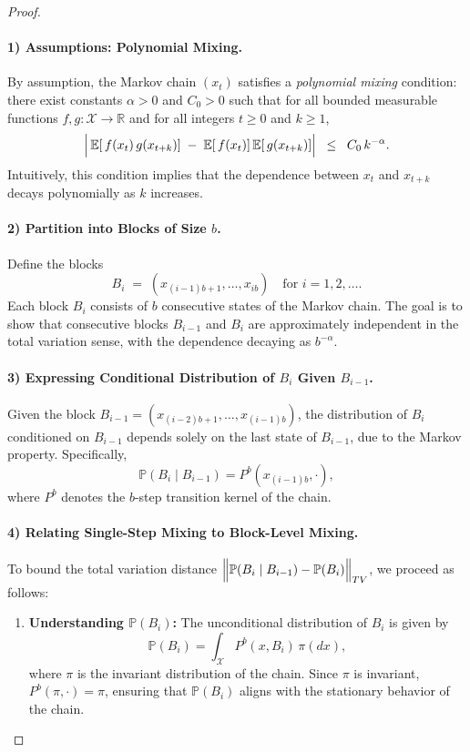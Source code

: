 \begin{proof}
\;\newline
\paragraph{1) Assumptions: Polynomial Mixing.}
By assumption, the Markov chain \( (x_t) \) satisfies a \emph{polynomial mixing} condition: there exist constants \( \alpha > 0 \) and \( C_0 > 0 \) such that for all bounded measurable functions \( f, g: \mathcal{X} \to \mathbb{R} \) and for all integers \( t \geq 0 \) and \( k \geq 1 \),
\[
  \Bigl|\,
    \mathbb{E}[\,f(x_t)\,g(x_{t+k})]
    \;-\;
    \mathbb{E}[\,f(x_t)]\,\mathbb{E}[\,g(x_{t+k})]
  \Bigr|
  \;\;\le\;\;
  C_0\,k^{-\alpha}.
\]
Intuitively, this condition implies that the dependence between \( x_t \) and \( x_{t+k} \) decays polynomially as \( k \) increases.

\paragraph{2) Partition into Blocks of Size \( b \).}
Define the blocks
\[
  B_i \;=\; (x_{(i-1)b+1}, \dots, x_{ib})
  \quad
  \text{for } i=1,2,\dots.
\]
Each block \( B_i \) consists of \( b \) consecutive states of the Markov chain. The goal is to show that consecutive blocks \( B_{i-1} \) and \( B_i \) are approximately independent in the total variation sense, with the dependence decaying as \( b^{-\alpha} \).

\paragraph{3) Expressing Conditional Distribution of \( B_i \) Given \( B_{i-1} \).}
Given the block \( B_{i-1} = (x_{(i-2)b+1}, \dots, x_{(i-1)b}) \), the distribution of \( B_i \) conditioned on \( B_{i-1} \) depends solely on the last state of \( B_{i-1} \), due to the Markov property. Specifically,
\[
  \mathbb{P}(B_i \mid B_{i-1}) = P^b(x_{(i-1)b}, \cdot),
\]
where \( P^b \) denotes the \( b \)-step transition kernel of the chain.

\paragraph{4) Relating Single-Step Mixing to Block-Level Mixing.}
To bound the total variation distance \( \Bigl\|\mathbb{P}(B_i \mid B_{i-1}) - \mathbb{P}(B_i)\Bigr\|_{TV} \), we proceed as follows:

\begin{enumerate}
  \item \textbf{Understanding \( \mathbb{P}(B_i) \):}  
    The unconditional distribution of \( B_i \) is given by
    \[
      \mathbb{P}(B_i) = \int_{\mathcal{X}} P^b(x, B_i) \, \pi(dx),
    \]
    where \( \pi \) is the invariant distribution of the chain. Since \( \pi \) is invariant, \( P^b(\pi, \cdot) = \pi \), ensuring that \( \mathbb{P}(B_i) \) aligns with the stationary behavior of the chain.


\end{enumerate}
\end{proof}
